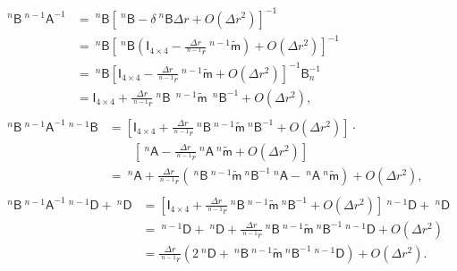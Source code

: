 \documentclass[preprint,10pt,times]{elsarticle}
\numberwithin{equation}{section}
\renewcommand{\u}[1]{\boldsymbol{#1}}
\newcommand{\usf}[1]{\u{\mathsf #1}}
\renewcommand{\>}{$\Rightarrow$}
\begin{document}
\begin{subequations}
	\begin{align}
	\begin{split}
		~^{n}{\usf{B}} ~^{{n-1}}{\usf{A}}^{-1}
		& = ~^{n}{\usf{B}} \left[ ~^{n}\usf{B} - \delta ~^{n}\usf{B} \Delta r + O(\Delta r^2) \right]^{-1} \\
		& = ~^{n}{\usf{B}} \left[ ~^{n}\usf{B} \left( \usf{I}_{4\times 4}- \frac{\Delta r}{~^{n-1}\!{r}} ~^{n-1}\tilde{\usf{m}} \right) + O(\Delta r^2) \right]^{-1} \\
		& = ~^{n}{\usf{B}} \left[ \usf{I}_{4\times 4} - \frac{\Delta r}{~^{n-1}\!{r}} ~^{n-1}\tilde{\usf{m}} + O(\Delta r^2) \right]^{-1} \usf{B}^{-1}_{n} \\
		& = \usf{I}_{4\times 4} + \frac{\Delta r}{~^{n-1}\!{r}} ~^{n}{\usf{B}}\  ~^{n-1}\tilde{\usf{m}}\  ~^{n}{\usf{B}}^{-1} + O(\Delta r^2),
	\end{split}\\
	\begin{split}
		~^{n}{\usf{B}} ~^{{n-1}}{\usf{A}}^{-1} ~^{{n-1}}{\usf{B}}
		& = \left[ \usf{I}_{4\times 4} + \frac{\Delta r}{~^{n-1}\!{r}} ~^{n}{\usf{B}} ~^{n-1}\tilde{\usf{m}} ~^{n}{\usf{B}}^{-1} + O(\Delta r^2) \right] \cdot \\
		& \qquad \left[ ~^{n}\usf{A} - \frac{\Delta r}{~^{n-1}\!{r}} ~^{n}{\usf{A}} ~^{n}\tilde{\usf{m}} + O(\Delta r^2) \right] \\
		& = ~^{n}\usf{A} + \frac{\Delta r}{~^{n-1}\!{r}} \left( ~^{n}{\usf{B}} ~^{n-1}\tilde{\usf{m}} ~^{n}{\usf{B}}^{-1} ~^{n}\usf{A} - ~^{n}{\usf{A}} ~^{n}\tilde{\usf{m}} \right) + O(\Delta r^2),
	\end{split} \\
	\begin{split}
		~^{n}{\usf{B}} ~^{{n-1}}{\usf{A}}^{-1} ~^{{n-1}}{\usf{D}} + ~^{n}{\usf{D}}
		& = \left[ \usf{I}_{4\times 4} + \frac{\Delta r}{~^{n-1}\!{r}} ~^{n}{\usf{B}} ~^{n-1}\tilde{\usf{m}} ~^{n}{\usf{B}}^{-1} + O(\Delta r^2) \right] ~^{{n-1}}{\usf{D}} + ~^{n}{\usf{D}} \\
		& = ~^{{n-1}}{\usf{D}} + ~^{n}{\usf{D}} + \frac{\Delta r}{~^{n-1}\!{r}} ~^{n}{\usf{B}} ~^{n-1}\tilde{\usf{m}} ~^{n}{\usf{B}}^{-1} ~^{{n-1}}{\usf{D}} + O(\Delta r^2) \\
		& = \frac{\Delta r}{~^{n-1}\!{r}} \left( 2~^{n}{\usf{D}} + ~^{n}{\usf{B}} ~^{n-1}\tilde{\usf{m}} ~^{n}{\usf{B}}^{-1} ~^{{n-1}}{\usf{D}} \right) + O(\Delta r^2).
	\end{split}
	\end{align}
	\label{eq:C5}
\end{subequations}
\end{document}
